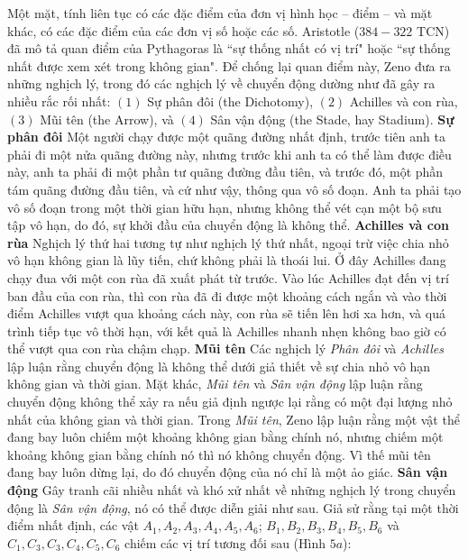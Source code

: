 \begin{multicols}{2}
	Một mặt, tính liên tục có các đặc điểm của đơn vị hình học -- điểm -- và mặt khác, có các đặc điểm của các đơn vị số hoặc các số.
	Aristotle ($384-322$ TCN) đã mô tả quan điểm của Pythagoras là ``sự thống nhất có vị trí" hoặc ``sự thống nhất được xem xét trong không gian". 
	Để chống lại quan điểm này, Zeno đưa ra những nghịch lý, trong đó các nghịch lý về chuyển động dường như đã gây ra nhiều rắc rối nhất:
	\vskip 0.1cm
	$(1)$ Sự phân đôi (the Dichotomy), 
	\vskip 0.1cm
	$(2)$ Achilles và con rùa, 
	\vskip 0.1cm
	$(3)$ Mũi tên (the Arrow), và 
	\vskip 0.1cm
	$(4)$ Sân vận động (the Stade, hay Stadium).
	\vskip 0.1cm
	\textbf{Sự phân đôi}
	\vskip 0.1cm
	Một người chạy được một quãng đường nhất định, trước tiên anh ta phải đi một nửa quãng đường này, nhưng trước khi anh ta có thể làm được điều này, anh ta phải đi một phần tư quãng đường đầu tiên, và trước đó, một phần tám quãng đường đầu tiên, và cứ như vậy, thông qua vô số đoạn.  Anh ta phải tạo vô số đoạn trong một thời gian hữu hạn, nhưng không thể vét cạn một bộ sưu tập vô hạn, do đó, sự khởi đầu của chuyển động là không thể.
	\vskip 0.1cm
	\textbf{Achilles và con rùa}
	\vskip 0.1cm
	Nghịch lý thứ hai tương tự như nghịch lý thứ nhất, ngoại trừ việc chia nhỏ vô hạn không gian là lũy tiến, chứ không phải là thoái lui. Ở đây Achilles đang chạy đua với một con rùa đã xuất phát từ trước. Vào lúc Achilles đạt đến vị trí ban đầu của con rùa, thì con rùa đã đi được một khoảng cách ngắn và vào thời điểm Achilles vượt qua khoảng cách này, con rùa sẽ tiến lên hơi xa hơn, và quá trình tiếp tục vô thời hạn, với kết quả là Achilles nhanh nhẹn không bao giờ có thể vượt qua con rùa chậm chạp.
	\vskip 0.1cm
	\textbf{Mũi tên}
	\vskip 0.1cm
	Các nghịch lý \textit{Phân đôi} và \textit{Achilles} lập luận rằng chuyển động là không thể dưới giả thiết về sự chia nhỏ vô hạn không gian và thời gian. Mặt khác, \textit{Mũi tên} và \textit{Sân vận động} lập luận rằng chuyển động không thể xảy ra nếu giả định ngược lại rằng có một đại lượng nhỏ nhất của không gian và thời gian. Trong \textit{Mũi tên}, Zeno lập luận rằng một vật thể đang bay luôn chiếm một khoảng không gian bằng chính nó, nhưng chiếm một khoảng không gian bằng chính nó thì nó không chuyển động. Vì thế mũi tên đang bay luôn dừng lại, do đó chuyển động của nó chỉ là một ảo giác.
	\vskip 0.1cm
	\textbf{Sân vận động}
	\vskip 0.1cm
	Gây tranh cãi nhiều nhất và khó xử nhất về những nghịch lý trong chuyển động là \textit{Sân vận động}, nó có thể được diễn giải như sau. 
	\vskip 0.1cm
	Giả sử rằng tại một thời điểm nhất định, các vật ${A_1}, {A_2}, {A_3},{A_4},{A_5},{A_6}$; $B_1, B_2, B_3, B_4, B_5, B_6$  và $C_1, C_3, C_3, C_4, C_5, C_6$ chiếm các vị trí tương đối sau (Hình $5a$):

\end{multicols}
